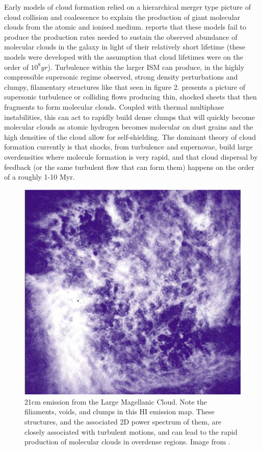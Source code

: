 \documentclass[12pt, preprint]{aastex}
\begin{document}
Early models of cloud formation relied on a hierarchical merger type picture of
cloud collision and coalescence to explain the production of giant molecular
clouds from the atomic and ionised medium.  \citet{larson1981} reports that
these models fail to produce the production rates needed to sustain the observed
abundance of molecular clouds in the galaxy in light of their relatively short
lifetime (these models were developed with the assumption that cloud lifetimes
were on the order of $10^8 yr$).  Turbulence within the larger ISM can produce, 
in the highly compressible supersonic regime observed, strong density perturbations and
clumpy, filamentary structures like that seen in figure 2.  \citet{val2006}
presents a picture of supersonic turbulence or colliding flows producing thin, 
shocked sheets that then fragments to form molecular clouds. Coupled with
thermal multiphase instabilities, this can act to rapidly build dense clumps
that will quickly become molecular clouds as atomic hydrogen becomes molecular
on dust grains and the high densities of the cloud allow for self-shielding.
The dominant theory of cloud formation currently is that shocks, from turbulence
and supernovae, build large overdensities where molecule formation is very
rapid, and that cloud dispersal by feedback (or the same turbulent flow that
can form them) happens on the order of a roughly 1-10 Myr.

\begin{figure}[H]
	\centering
	\includegraphics[scale=0.4]{figures/turbulent_LMC_elm2004.eps}
	\caption{21cm emission from the Large Magellanic Cloud.  Note the
		filiaments, voids, and clumps in this HI emission map.  These
		structures, and the associated 2D power spectrum of them, are closely
		associated with turbulent motions, and can lead to the rapid production
	of molecular clouds in overdense regions.  Image from \citet{elm2004}.}
\end{figure}
\end{document}
